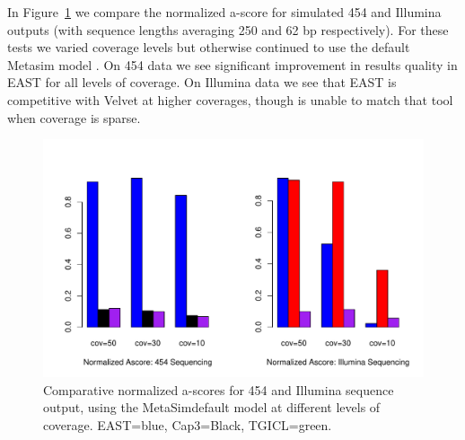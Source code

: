 \documentclass[10pt]{bmc_article}
\newcommand{\capthree} {{\small Cap3}}
\newcommand{\metasim} {{\small MetaSim}}
\newcommand{\tgicl} {{\small TGICL}}
\newcommand{\east} {{\small EAST}}
\newcommand{\velvet}{{\small Velvet}}
\newenvironment{bmcformat}{\begin{raggedright}\baselineskip20pt\sloppy\setboolean{publ}{false}}{\end{raggedright}\baselineskip20pt\sloppy}
\begin{document}
\begin{bmcformat}
 In
Figure~\ref{nextgenAscore} we compare the normalized a-score for
simulated 454 and Illumina outputs (with sequence lengths averaging
250 and 62 bp respectively).  For these tests we varied coverage
levels but otherwise continued to use the default Metasim model
\cite{Richter08}.  On 454 data we see significant improvement in
results quality in \east\/ for all levels of coverage.  On Illumina
data we see that \east\/ is competitive with \velvet\/ at higher
coverages, though is unable to match that tool when coverage is
sparse.

\begin{figure}[htb]
\centerline{\includegraphics[width=6in]{pics.d/ascore_nxtgen.pdf}}
\caption{Comparative normalized a-scores for 454 and Illumina sequence
  output, using the \metasim default model at different levels
  of coverage.  \east=blue, \capthree=Black, \tgicl=green.  }
\label{nextgenAscore}
\end{figure}


\end{bmcformat}
\end{document}
